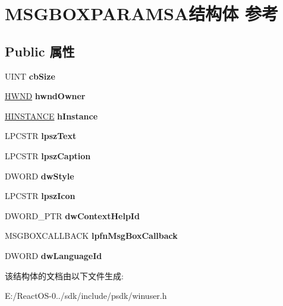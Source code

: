 \hypertarget{struct_m_s_g_b_o_x_p_a_r_a_m_s_a}{}\section{M\+S\+G\+B\+O\+X\+P\+A\+R\+A\+M\+S\+A结构体 参考}
\label{struct_m_s_g_b_o_x_p_a_r_a_m_s_a}
\subsection*{Public 属性}
\begin{DoxyCompactItemize}
\item 
\mbox{\label{struct_m_s_g_b_o_x_p_a_r_a_m_s_a_adb0e934a3c8986133103ab08f07fc6b9}} 
U\+I\+NT {\bfseries cb\+Size}
\item 
\mbox{\label{struct_m_s_g_b_o_x_p_a_r_a_m_s_a_add772f2268b3eb2a9e67fc88096d3408}} 
\hyperlink{interfacevoid}{H\+W\+ND} {\bfseries hwnd\+Owner}
\item 
\mbox{\label{struct_m_s_g_b_o_x_p_a_r_a_m_s_a_ab4734649e0fef88ea9245a7db0194ece}} 
\hyperlink{interfacevoid}{H\+I\+N\+S\+T\+A\+N\+CE} {\bfseries h\+Instance}
\item 
\mbox{\label{struct_m_s_g_b_o_x_p_a_r_a_m_s_a_adf57498f667e84b8c9b4430e66226e6b}} 
L\+P\+C\+S\+TR {\bfseries lpsz\+Text}
\item 
\mbox{\label{struct_m_s_g_b_o_x_p_a_r_a_m_s_a_ac46ea50aa4d828a917aa67a2d67e7473}} 
L\+P\+C\+S\+TR {\bfseries lpsz\+Caption}
\item 
\mbox{\label{struct_m_s_g_b_o_x_p_a_r_a_m_s_a_a88bbad855d99b618872bb10be97685ba}} 
D\+W\+O\+RD {\bfseries dw\+Style}
\item 
\mbox{\label{struct_m_s_g_b_o_x_p_a_r_a_m_s_a_a9feb228232dfc0660798272bda8121c8}} 
L\+P\+C\+S\+TR {\bfseries lpsz\+Icon}
\item 
\mbox{\label{struct_m_s_g_b_o_x_p_a_r_a_m_s_a_a8123f7ecac37f96e8c74d66644b19cdd}} 
D\+W\+O\+R\+D\+\_\+\+P\+TR {\bfseries dw\+Context\+Help\+Id}
\item 
\mbox{\label{struct_m_s_g_b_o_x_p_a_r_a_m_s_a_a477a4e8b65007d37483d2bbebcd347cc}} 
M\+S\+G\+B\+O\+X\+C\+A\+L\+L\+B\+A\+CK {\bfseries lpfn\+Msg\+Box\+Callback}
\item 
\mbox{\label{struct_m_s_g_b_o_x_p_a_r_a_m_s_a_a32e63e67e1342f3eda1f57b55d2412ad}} 
D\+W\+O\+RD {\bfseries dw\+Language\+Id}
\end{DoxyCompactItemize}


该结构体的文档由以下文件生成\+:\begin{DoxyCompactItemize}
\item 
E\+:/\+React\+O\+S-\/0../sdk/include/psdk/winuser.\+h\end{DoxyCompactItemize}
